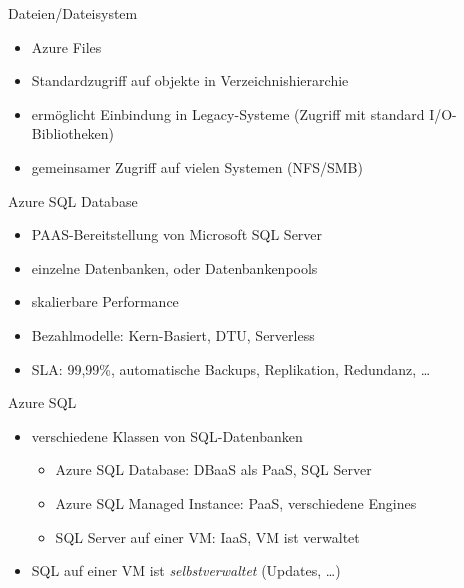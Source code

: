 \begin{flashcard}[Definition]{Dateien/Dateisystem}
  \begin{itemize}
    \item Azure Files
    \item Standardzugriff auf objekte in Verzeichnishierarchie
    \item ermöglicht Einbindung in Legacy-Systeme\newline
    (Zugriff mit standard I/O-Bibliotheken)
    \item gemeinsamer Zugriff auf vielen Systemen (NFS/SMB)
  \end{itemize}
\end{flashcard}

\begin{flashcard}[Definition]{Azure SQL Database}
  \begin{itemize}
    \item PAAS-Bereitstellung von Microsoft SQL Server
    \item einzelne Datenbanken, oder Datenbankenpools
    \item skalierbare Performance
    \item Bezahlmodelle: Kern-Basiert, DTU, Serverless
    \item SLA: 99,99\%, automatische Backups, Replikation, Redundanz, \ldots
  \end{itemize}
\end{flashcard}

\begin{flashcard}[Definition]{Azure SQL}
  \begin{itemize}
    \item verschiedene Klassen von SQL-Datenbanken
      \begin{itemize}
        \item Azure SQL Database: DBaaS als PaaS, SQL Server
        \item Azure SQL Managed Instance: PaaS, verschiedene Engines
          \item SQL Server auf einer VM: IaaS, VM ist verwaltet
      \end{itemize}
      \item SQL auf einer VM ist \emph{selbstverwaltet} (Updates, \ldots)
  \end{itemize}
\end{flashcard}

